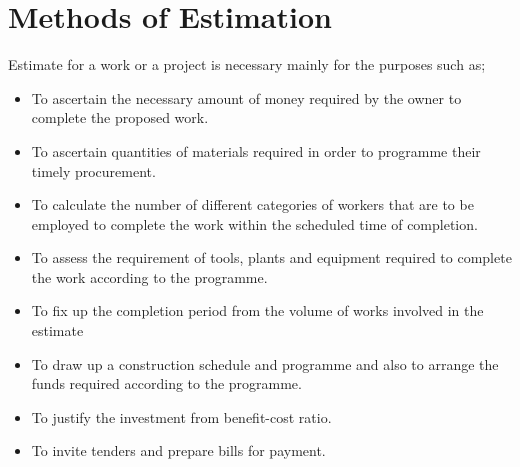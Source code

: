 \section{Methods of Estimation}
Estimate for a work or a project is necessary mainly for the purposes such as;
\begin{itemize}

\item	To ascertain the necessary amount of money required by the owner to complete the proposed work. 
\item	To ascertain quantities of materials required in order to programme their timely procurement. 
\item	To calculate the number of different categories of workers that are to be employed to complete the work within the scheduled time of completion.
\item	To assess the requirement of tools, plants and equipment required to complete the work according to the programme.
\item	To fix up the completion period from the volume of works involved in the estimate
\item	To draw up a construction schedule and programme and also to arrange the funds required according to the programme.
\item	To justify the investment from benefit-cost ratio.
\item	To invite tenders and prepare bills for payment.


\end{itemize}


